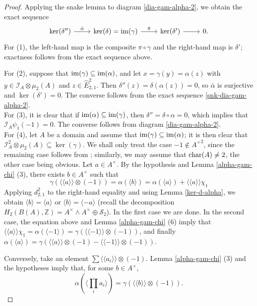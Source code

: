 \documentclass[11pt]{amsart}
\theoremstyle{definition}
\theoremstyle{plain}
\theoremstyle{definition}
\numberwithin{equation}{section}
\newcommand{\z}{\mathbb{Z}}
\newcommand{\II}{\mathcal{I}}
\renewcommand{\SS}{\mathcal{S}}
\renewcommand{\aa}{{A^\times}}
\newcommand{\lan}{\langle}
\newcommand{\ran}{\rangle}
\newcommand{\Lan}{\langle \! \langle}
\newcommand{\Ran}{\rangle \! \rangle}
\newcommand{\im}{{\rm im}}
\renewcommand{\char}{{\rm char}}
\begin{document}
	\begin{proof}
		Applying the snake lemma to diagram \eqref{dia-gam-alpha-2}, we obtain the exact sequence
		\begin{equation}\label{snk-dia-gam-alpha-2}
			\begin{tikzcd}
				\ker(\delta'')\ar[r,"\bar{\alpha}"] & \ker(\delta)=\im(\gamma)\ar[r,"\bar{\pi}"] & \ker(\delta') \ar[r] & 0.
			\end{tikzcd}
		\end{equation}
		For (1), the left-hand map is the composite $\pi\circ\gamma$ and the right-hand map is $\delta'$; exactness follows from the exact sequence above.
		
		For (2), suppose that $\im(\gamma)\subseteq\im(\alpha)$, and let $x=\gamma(y)=\alpha(z)$ with $y\in\II_A\otimes\mu_2(A)$ and $z\in\hat{E}^2_{2,1}$. Then $\delta''(z)=\delta(\alpha(z))=0$, so $\bar{\alpha}$ is surjective and $\ker(\delta')=0$. The converse follows from the exact sequence \eqref{snk-dia-gam-alpha-2}.
		\\
		For (3), it is clear that if $\im(\alpha)\subseteq\im(\gamma)$, then $\delta''=\delta\circ\alpha=0$, which implies that $\II_A\psi_1(-1)=0$. The converse follows from diagram \eqref{dia-gam-alpha-2}.
		\\
		For (4), let $A$ be a domain and assume that $\im(\gamma)\subseteq\im(\alpha)$; it is then clear that $\II_A^2\otimes\mu_2(A)\subseteq \ker(\gamma)$. We shall only treat the case $-1\notin\aa^2$, since the remaining case follows from \cite[Corollary 6.4]{B-E--2023}; similarly, we may assume that $\char(A)\neq 2$, the other case being obvious. Let $a\in\aa$. By the hypothesis and Lemma \ref{alpha-gam-chi} (3), there exists $b\in\aa$ such that 
		\[
		\gamma(\Lan a\Ran\otimes(-1))=\alpha(\lan b\ran)=\alpha(\lan a\ran)+\Lan a\Ran\chi_1
		\]
		Applying $d^2_{2,1}$ to the right-hand equality and using Lemma \ref{ker-d-alpha}, we obtain $\lan b\ran=\lan a\ran$ or $\lan b\ran=\lan -a\ran$ (recall the decomposition $H_2(B(A),\z)=\aa\wedge\aa\oplus \SS_2$). In the first case we are done. In the second case, the equation above and Lemma \ref{alpha-gam-chi} (6) imply that $\Lan a\Ran\chi_1=\alpha(\lan -1\ran)=\gamma(\Lan -1\Ran\otimes(-1))$, and finally $\alpha(\lan a\ran)=\gamma(\Lan a\Ran\otimes(-1)-\Lan -1\Ran\otimes (-1))$. 
		
		Conversely, take an element $\sum\Lan a_i\Ran\otimes(-1)$. Lemma \ref{alpha-gam-chi} (3) and the hypotheses imply that, for some $b\in\aa$,
		\begin{equation}
			\label{eq-prf4}
			\alpha(\lan\prod_{i}a_i\ran)=\gamma(\Lan b\Ran\otimes(-1)).
		\end{equation}
		

\end{proof}
\end{document}

